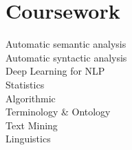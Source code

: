 \section{Coursework}

\sectionsep
Automatic semantic analysis \\
Automatic syntactic analysis \\
Deep Learning for NLP \\
Statistics \\
Algorithmic \\
Terminology \& Ontology \\
Text Mining \\
Linguistics \\

\sectionsep

